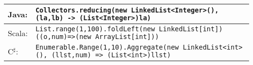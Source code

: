 \documentclass[paper.tex]{subfiles}
\begin{document}
\begin{tabular}{lL{12cm}}
Java: & \texttt{Collectors.reducing(new LinkedList<Integer>(), (la,lb) -> (List<Integer>)la)}\\
\hline
Scala:&\texttt{List.range(1,100).foldLeft(new LinkedList[int])((o,num)=>(new ArrayList[int]))}\\
\hline
C$^\sharp$: & \texttt{Enumerable.Range(1,10).Aggregate(new LinkedList<int>(), (llst,num) => (List<int>)llst)}\\
\end{tabular}
\end{document}
